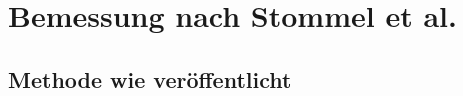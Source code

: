 
\section{Bemessung nach Stommel et al.}
\label{sec:stommel_ergebnis}

\subsection{Methode wie veröffentlicht}
\label{sec:stommel_veroeffentlicht}

